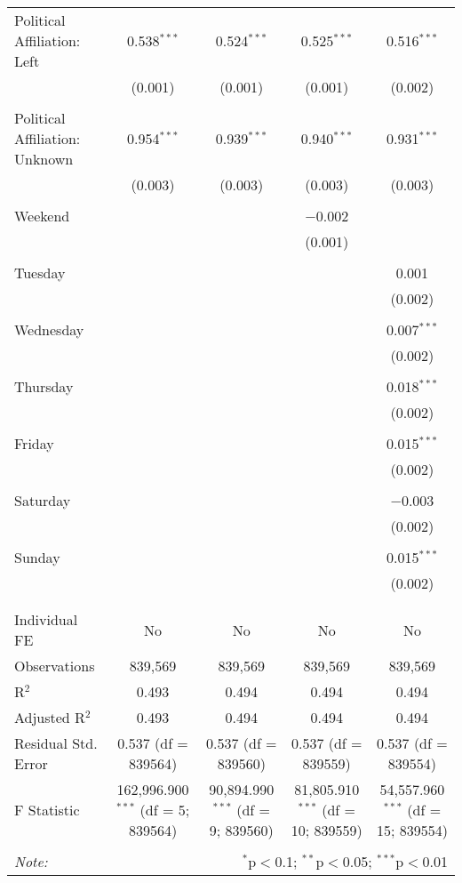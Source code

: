 \documentclass[
]{article}
\begin{document}
\begin{table}[!htbp]
{\begin{tabular}{@{\extracolsep{5pt}}lcccc}
 Political Affiliation: Left & 0.538$^{***}$ & 0.524$^{***}$ & 0.525$^{***}$ & 0.516$^{***}$ \\ 
  & (0.001) & (0.001) & (0.001) & (0.002) \\ 
  & & & & \\ 
 Political Affiliation: Unknown & 0.954$^{***}$ & 0.939$^{***}$ & 0.940$^{***}$ & 0.931$^{***}$ \\ 
  & (0.003) & (0.003) & (0.003) & (0.003) \\ 
  & & & & \\ 
 Weekend &  &  & $-$0.002 &  \\ 
  &  &  & (0.001) &  \\ 
  & & & & \\ 
 Tuesday &  &  &  & 0.001 \\ 
  &  &  &  & (0.002) \\ 
  & & & & \\ 
 Wednesday &  &  &  & 0.007$^{***}$ \\ 
  &  &  &  & (0.002) \\ 
  & & & & \\ 
 Thursday &  &  &  & 0.018$^{***}$ \\ 
  &  &  &  & (0.002) \\ 
  & & & & \\ 
 Friday &  &  &  & 0.015$^{***}$ \\ 
  &  &  &  & (0.002) \\ 
  & & & & \\ 
 Saturday &  &  &  & $-$0.003 \\ 
  &  &  &  & (0.002) \\ 
  & & & & \\ 
 Sunday &  &  &  & 0.015$^{***}$ \\ 
  &  &  &  & (0.002) \\ 
  & & & & \\ 
\hline \\[-1.8ex] 
Individual FE & No & No & No & No \\ 
Observations & 839,569 & 839,569 & 839,569 & 839,569 \\ 
R$^{2}$ & 0.493 & 0.494 & 0.494 & 0.494 \\ 
Adjusted R$^{2}$ & 0.493 & 0.494 & 0.494 & 0.494 \\ 
Residual Std. Error & 0.537 (df = 839564) & 0.537 (df = 839560) & 0.537 (df = 839559) & 0.537 (df = 839554) \\ 
F Statistic & 162,996.900$^{***}$ (df = 5; 839564) & 90,894.990$^{***}$ (df = 9; 839560) & 81,805.910$^{***}$ (df = 10; 839559) & 54,557.960$^{***}$ (df = 15; 839554) \\ 
\hline 
\hline \\[-1.8ex] 
\textit{Note:}  & \multicolumn{4}{r}{$^{*}$p$<$0.1; $^{**}$p$<$0.05; $^{***}$p$<$0.01} \\ 
\end{tabular}
} 
\end{table} 
\newpage
\end{document}
